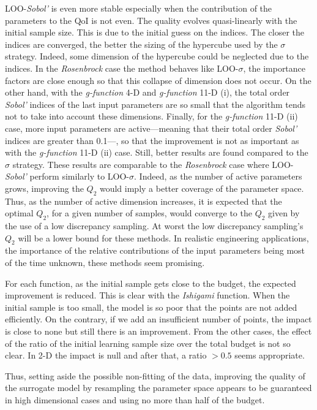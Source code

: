 LOO-\textit{Sobol'} is even more stable especially when the contribution of the parameters to the QoI is not even. The quality evolves quasi-linearly with the initial sample size. This is due to the initial guess on the indices. The closer the indices are converged, the better the sizing of the hypercube used by the $\sigma$ strategy. Indeed, some dimension of the hypercube could be neglected due to the indices. In the \textit{Rosenbrock} case the method behaves like LOO-$\sigma$, the importance factors are close enough so that this collapse of dimension does not occur. On the other hand, with the \textit{g-function} 4-D and \textit{g-function} 11-D (i), the total order \textit{Sobol'} indices of the last input parameters are so small that the algorithm tends not to take into account these dimensions. Finally, for the \textit{g-function} 11-D (ii) case, more input parameters are active---meaning that their total order \textit{Sobol'} indices are greater than 0.1---, so that the improvement is not as important as with the \textit{g-function} 11-D (ii) case. Still, better results are found compared to the $\sigma$ strategy. These results are comparable to the \textit{Rosenbrock} case where LOO-\textit{Sobol'} perform similarly to LOO-$\sigma$. Indeed, as the number of active parameters grows, improving the $Q_2$ would imply a better coverage of the parameter space. Thus, as the number of active dimension increases, it is expected that the optimal $Q_2$, for a given number of samples, would converge to the $Q_2$ given by the use of a low discrepancy sampling. At worst the low discrepancy sampling's $Q_2$ will be a lower bound for these methods. In realistic engineering applications, the importance of the relative contributions of the input parameters being most of the time unknown, these methods seem promising.

For each function, as the initial sample gets close to the budget, the expected improvement is reduced. This is clear with the \textit{Ishigami} function. When the initial sample is too small, the model is so poor that the points are not added efficiently. On the contrary, if we add an insufficient number of points, the impact is close to none but still there is an improvement. From the other cases, the effect of the ratio of the initial learning sample size over the total budget is not so clear. In 2-D the impact is null and after that, a ratio $>0.5$ seems appropriate.

Thus, setting aside the possible non-fitting of the data, improving the quality of the surrogate model by resampling the parameter space appears to be guaranteed in high dimensional cases and using no more than half of the budget.


